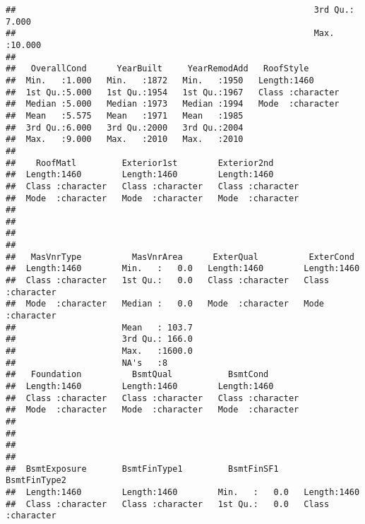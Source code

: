 \documentclass[]{article}
\begin{document}
\begin{verbatim}
##                                                           3rd Qu.: 7.000  
##                                                           Max.   :10.000  
##                                                                           
##   OverallCond      YearBuilt     YearRemodAdd   RoofStyle        
##  Min.   :1.000   Min.   :1872   Min.   :1950   Length:1460       
##  1st Qu.:5.000   1st Qu.:1954   1st Qu.:1967   Class :character  
##  Median :5.000   Median :1973   Median :1994   Mode  :character  
##  Mean   :5.575   Mean   :1971   Mean   :1985                     
##  3rd Qu.:6.000   3rd Qu.:2000   3rd Qu.:2004                     
##  Max.   :9.000   Max.   :2010   Max.   :2010                     
##                                                                  
##    RoofMatl         Exterior1st        Exterior2nd       
##  Length:1460        Length:1460        Length:1460       
##  Class :character   Class :character   Class :character  
##  Mode  :character   Mode  :character   Mode  :character  
##                                                          
##                                                          
##                                                          
##                                                          
##   MasVnrType          MasVnrArea      ExterQual          ExterCond        
##  Length:1460        Min.   :   0.0   Length:1460        Length:1460       
##  Class :character   1st Qu.:   0.0   Class :character   Class :character  
##  Mode  :character   Median :   0.0   Mode  :character   Mode  :character  
##                     Mean   : 103.7                                        
##                     3rd Qu.: 166.0                                        
##                     Max.   :1600.0                                        
##                     NA's   :8                                             
##   Foundation          BsmtQual           BsmtCond        
##  Length:1460        Length:1460        Length:1460       
##  Class :character   Class :character   Class :character  
##  Mode  :character   Mode  :character   Mode  :character  
##                                                          
##                                                          
##                                                          
##                                                          
##  BsmtExposure       BsmtFinType1         BsmtFinSF1     BsmtFinType2      
##  Length:1460        Length:1460        Min.   :   0.0   Length:1460       
##  Class :character   Class :character   1st Qu.:   0.0   Class :character  

\end{verbatim}
\end{document}
